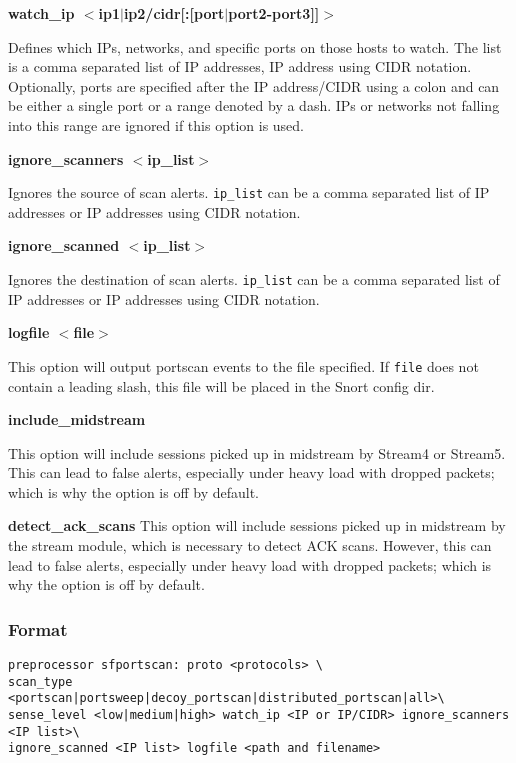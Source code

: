 \documentclass[english]{report}
\newcounter{slistnum}
\newenvironment{slist}
{ \begin{list}{ {\bf \arabic{slistnum}.} }{\usecounter{slistnum} } }
{ \end{list} }
\begin{document}
\begin{slist}
\item \textbf{watch\_ip $<$ip1$|$ip2/cidr[:[port$|$port2-port3]]$>$ }

  Defines which IPs, networks, and specific ports on those hosts to watch.
  The list is a comma separated list of IP addresses, IP address using CIDR
  notation.  Optionally, ports are specified after the IP address/CIDR using
  a colon and can be either a single port or a range denoted by a dash.
  IPs or networks not falling into this range are ignored if this option
  is used.

\item \textbf{ignore\_scanners $<$ip\_list$>$ }

  Ignores the source of scan alerts.  \texttt{ip\_list} can be a comma
  separated list of IP addresses or IP addresses using CIDR notation.

\item \textbf{ignore\_scanned $<$ip\_list$>$ }

  Ignores the destination of scan alerts. \texttt{ip\_list} can be a comma
  separated list of IP addresses or IP addresses using CIDR notation.

\item \textbf{logfile $<$file$>$ } 

  This option will output portscan events to the file specified. If
  \texttt{file} does not contain a leading slash, this file will be placed in
  the Snort config dir.

\item \textbf{include\_midstream}

  This option will include sessions picked up in midstream by Stream4 or
  Stream5.  This can lead to false alerts, especially under heavy load with
  dropped packets; which is why the option is off by default.

\item \textbf{detect\_ack\_scans}
  This option will include sessions picked up in midstream by the stream
  module, which is necessary to detect ACK scans.  However, this can lead to
  false alerts, especially under heavy load with dropped packets; which is why
  the option is off by default.

\end{slist}

\subsubsection{Format}

\begin{verbatim}
preprocessor sfportscan: proto <protocols> \
scan_type <portscan|portsweep|decoy_portscan|distributed_portscan|all>\
sense_level <low|medium|high> watch_ip <IP or IP/CIDR> ignore_scanners <IP list>\
ignore_scanned <IP list> logfile <path and filename>
\end{verbatim}
\end{document}
